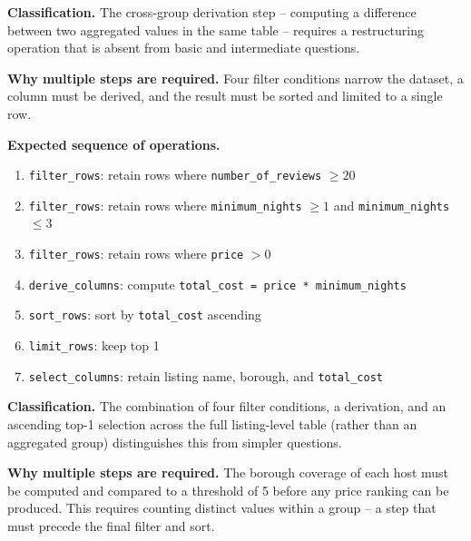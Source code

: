 \textbf{Classification.}
The cross-group derivation step -- computing a difference between two aggregated values in the same table -- requires a restructuring operation that is absent from basic and intermediate questions.



\textbf{Why multiple steps are required.}
Four filter conditions narrow the dataset, a column must be derived, and the result must be sorted and limited to a single row.

\textbf{Expected sequence of operations.}
\begin{enumerate}
  \item \texttt{filter\_rows}: retain rows where \texttt{number\_of\_reviews}
    $\geq 20$
  \item \texttt{filter\_rows}: retain rows where \texttt{minimum\_nights}
    $\geq 1$ and \texttt{minimum\_nights} $\leq 3$
  \item \texttt{filter\_rows}: retain rows where \texttt{price} $> 0$
  \item \texttt{derive\_columns}: compute
    \texttt{total\_cost = price * minimum\_nights}
  \item \texttt{sort\_rows}: sort by \texttt{total\_cost} ascending
  \item \texttt{limit\_rows}: keep top 1
  \item \texttt{select\_columns}: retain listing name, borough, and
    \texttt{total\_cost}
\end{enumerate}

\textbf{Classification.}
The combination of four filter conditions, a derivation, and an ascending top-1 selection across the full listing-level table (rather than an aggregated group) distinguishes this from simpler questions.



\textbf{Why multiple steps are required.}
The borough coverage of each host must be computed and compared to a threshold of 5 before any price ranking can be produced. This requires counting distinct values within a group -- a step that must precede the final filter and sort.

